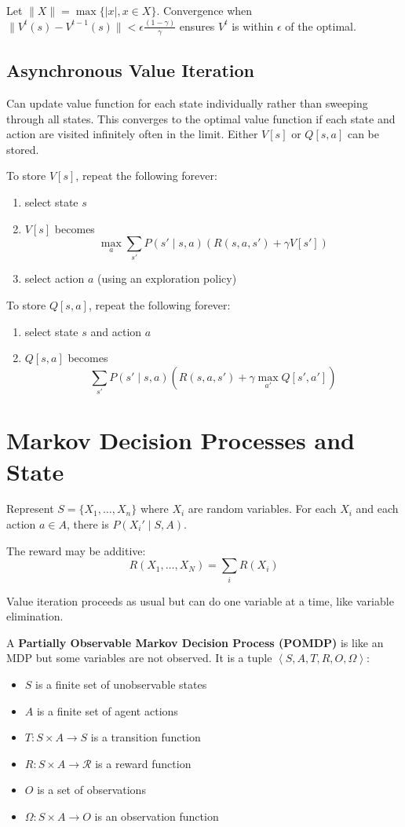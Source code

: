 \documentclass[11pt]{article}
\begin{document}
Let \(\| X \| = \max \{ |x|, x \in X \}\).
Convergence when \(\| V^{t}(s) - V^{t-1}(s) \| < \epsilon \frac{(1-\gamma)}{\gamma}\) ensures
\(V^{t}\) is within \(\epsilon\) of the optimal.
\subsection{Asynchronous Value Iteration}
\label{sec:org596942d}
Can update value function for each state individually rather than sweeping through all states.
This converges to the optimal value function if each state and action are visited
infinitely often in the limit.
Either \(V[s]\) or \(Q[s, a]\) can be stored.

To store \(V[s]\), repeat the following forever:
\begin{enumerate}
\item select state \(s\)
\item \(V[s]\) becomes
$$ \max_{a} \sum_{s'} P(s' \mid s, a) (R(s, a, s') + \gamma V[s']) $$
\item select action \(a\) (using an exploration policy)
\end{enumerate}

To store \(Q[s,a]\), repeat the following forever:
\begin{enumerate}
\item select state \(s\) and action \(a\)
\item \(Q[s, a]\) becomes
$$\sum_{s'} P(s' \mid s, a) \left( R(s, a, s') + \gamma \max_{a'} Q[s', a'] \right) $$
\end{enumerate}
\section{Markov Decision Processes and State}
\label{sec:org4e35b2f}
Represent \(S = \{X_{1}, \dots, X_{n}\}\) where \(X_{i}\) are random variables.
For each \(X_{i}\) and each action \(a \in A\), there is \(P(X_{i}' \mid S, A)\).

The reward may be additive:
$$ R(X_{1}, \dots, X_{N}) = \sum_{i} R(X_{i}) $$

Value iteration proceeds as usual but can do one variable at a time, like
variable elimination.

A \textbf{Partially Observable Markov Decision Process (POMDP)} is like an MDP but
some variables are not observed.
It is a tuple \(\left< S, A, T, R, O, \Omega \right>\):
\begin{itemize}
\item \(S\) is a finite set of unobservable states
\item \(A\) is a finite set of agent actions
\item \(T : S \times A \to S\) is a transition function
\item \(R : S \times A \to \mathcal{R}\) is a reward function
\item \(O\) is a set of observations
\item \(\Omega : S \times A \to O\) is an observation function
\end{itemize}
\end{document}
